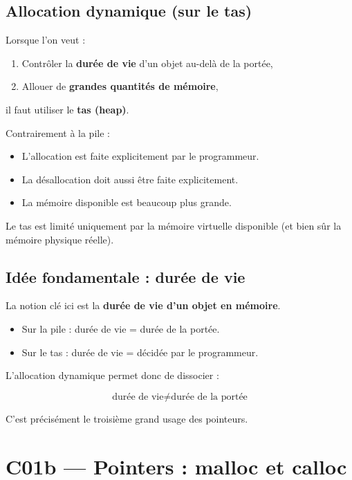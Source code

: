 \subsection{Allocation dynamique (sur le tas)}

Lorsque l’on veut :

\begin{enumerate}
    \item Contrôler la \textbf{durée de vie} d’un objet au-delà de la portée,
    \item Allouer de \textbf{grandes quantités de mémoire},
\end{enumerate}

il faut utiliser le \textbf{tas (heap)}.

Contrairement à la pile :

\begin{itemize}
    \item L’allocation est faite explicitement par le programmeur.
    \item La désallocation doit aussi être faite explicitement.
    \item La mémoire disponible est beaucoup plus grande.
\end{itemize}

Le tas est limité uniquement par la mémoire virtuelle disponible 
(et bien sûr la mémoire physique réelle).

\subsection{Idée fondamentale : durée de vie}

La notion clé ici est la \textbf{durée de vie d’un objet en mémoire}.

\begin{itemize}
    \item Sur la pile : durée de vie = durée de la portée.
    \item Sur le tas : durée de vie = décidée par le programmeur.
\end{itemize}

L’allocation dynamique permet donc de dissocier :

\[
\text{durée de vie} \neq \text{durée de la portée}
\]

C’est précisément le troisième grand usage des pointeurs.


\section{C01b — Pointers : malloc et calloc}
